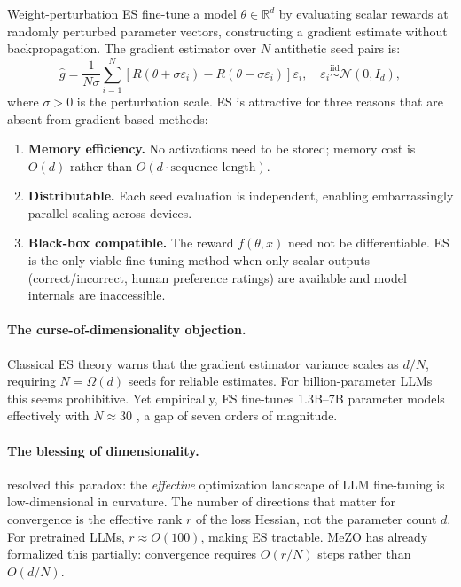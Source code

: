 \documentclass[11pt]{article}
\theoremstyle{definition}
\theoremstyle{remark}
\newcommand{\R}{\mathbb{R}}
\begin{document}
Weight-perturbation ES fine-tune a model $\theta \in \R^d$ by evaluating scalar rewards at randomly perturbed parameter vectors, constructing a gradient estimate without backpropagation. The gradient estimator over $N$ antithetic seed pairs is:
\begin{equation}
  \hat{g} = \frac{1}{N\sigma}\sum_{i=1}^{N}\left[R(\theta+\sigma\varepsilon_i) - R(\theta-\sigma\varepsilon_i)\right]\varepsilon_i,
  \quad \varepsilon_i \overset{\mathrm{iid}}{\sim} \mathcal{N}(0,I_d),
  \label{eq:es-estimator}
\end{equation}
where $\sigma > 0$ is the perturbation scale. ES is attractive for three reasons that are absent from gradient-based methods:
\begin{enumerate}[leftmargin=*]
  \item \textbf{Memory efficiency.} No activations need to be stored; memory cost is $O(d)$ rather than $O(d \cdot \text{sequence length})$.
  \item \textbf{Distributable.} Each seed evaluation is independent, enabling embarrassingly parallel scaling across devices.
  \item \textbf{Black-box compatible.} The reward $f(\theta, x)$ need not be differentiable. ES is the only viable fine-tuning method when only scalar outputs (correct/incorrect, human preference ratings) are available and model internals are inaccessible.
\end{enumerate}

\paragraph{The curse-of-dimensionality objection.}
Classical ES theory warns that the gradient estimator variance scales as $d/N$, requiring $N = \Omega(d)$ seeds for reliable estimates. For billion-parameter LLMs this seems prohibitive. Yet empirically, ES fine-tunes 1.3B--7B parameter models effectively with $N \approx 30$ \citep{qiu2025esscale,liang2026blessing}, a gap of seven orders of magnitude.

\paragraph{The blessing of dimensionality.}
\citet{liang2026blessing} resolved this paradox: the \emph{effective} optimization landscape of LLM fine-tuning is low-dimensional in curvature. The number of directions that matter for convergence is the effective rank $r$ of the loss Hessian, not the parameter count $d$. For pretrained LLMs, $r \approx O(100)$, making ES tractable. MeZO \citep{malladi2023mezo} has already formalized this partially: convergence requires $O(r/N)$ steps rather than $O(d/N)$.
\end{document}
